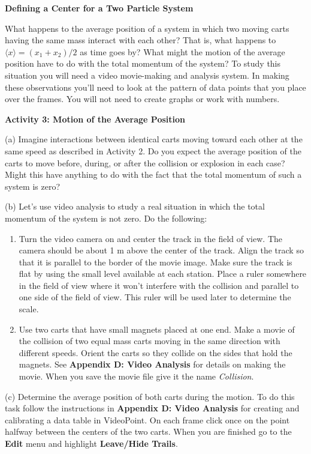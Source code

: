 \textbf{Defining a Center for a Two Particle System }

What happens to the average position of a system in which two moving carts having
the same mass interact with each other? That is, what happens to 
\(\langle x\rangle = (x_{1} 
+ x_{2} )/2\) as time goes by? What might the motion of the average position
have to do with the total momentum of the system? To study this situation you
will need a video movie-making and analysis system. In making these observations
you'll need to look at the pattern of data points that you place over the frames.
You will not need to create graphs or work with numbers. 

\textbf{Activity 3: Motion of the Average Position} 

(a) Imagine interactions between identical carts moving toward each other at
the same speed as described in Activity 2. Do you expect the average position
of the carts to move before, during, or after the collision or explosion in
each case? Might this have anything to do with the fact that the total momentum
of such a system is zero?
\vspace{20mm}

(b) Let's use video analysis to study a real situation in which the total momentum
of the system is not zero. Do the following: 

\begin{enumerate}
\item Turn the video camera on and center the track in the field of view. The camera
should be about 1 m above the center of the track. Align the track so that it
is parallel to the border of the movie image. Make sure the track is flat by
using the small level available at each station. Place a ruler somewhere in
the field of view where it won't interfere with the collision and parallel to
one side of the field of view. This ruler will be used later to determine the
scale. 
\item Use two carts that have small magnets placed at one end. Make a movie of the
collision of two equal mass carts moving in the same direction with different
speeds. Orient the carts so they collide on the sides that hold the magnets.
See \textbf{Appendix D: Video Analysis} for details on making the movie. When
you save the movie file give it the name \textit{Collision}. 
\end{enumerate}
(c) Determine the average position of both carts during the motion. To do this
task follow the instructions in \textbf{Appendix D: Video Analysis} for creating
and calibrating a data table in VideoPoint. On each frame click once on the
point halfway between the centers of the two carts. When you are finished go
to the \textbf{Edit} menu and highlight \textbf{Leave/Hide Trails}. 

